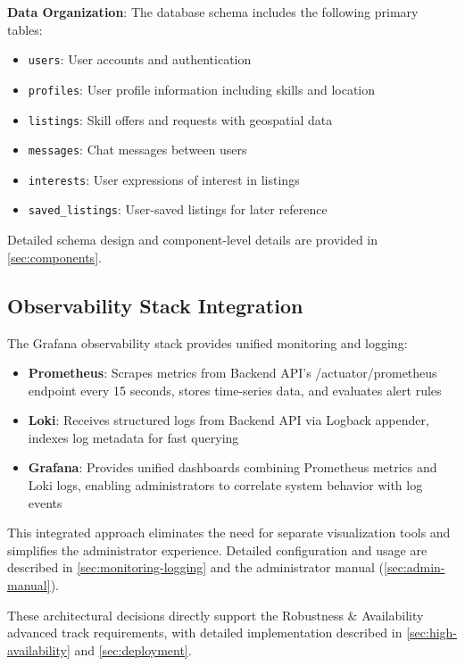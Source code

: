 \textbf{Data Organization}:
The database schema includes the following primary tables:
\begin{itemize}
    \item \texttt{users}: User accounts and authentication
    \item \texttt{profiles}: User profile information including skills and location
    \item \texttt{listings}: Skill offers and requests with geospatial data
    \item \texttt{messages}: Chat messages between users
    \item \texttt{interests}: User expressions of interest in listings
    \item \texttt{saved\_listings}: User-saved listings for later reference
\end{itemize}

Detailed schema design and component-level details are provided in \cref{sec:components}.

\subsection{Observability Stack Integration}

The Grafana observability stack provides unified monitoring and logging:

\begin{itemize}
    \item \textbf{Prometheus}: Scrapes metrics from Backend API's /actuator/prometheus endpoint every 15 seconds, stores time-series data, and evaluates alert rules
    \item \textbf{Loki}: Receives structured logs from Backend API via Logback appender, indexes log metadata for fast querying
    \item \textbf{Grafana}: Provides unified dashboards combining Prometheus metrics and Loki logs, enabling administrators to correlate system behavior with log events
\end{itemize}

This integrated approach eliminates the need for separate visualization tools and simplifies the administrator experience. Detailed configuration and usage are described in \cref{sec:monitoring-logging} and the administrator manual (\cref{sec:admin-manual}).

These architectural decisions directly support the Robustness \& Availability advanced track requirements, with detailed implementation described in \cref{sec:high-availability} and \cref{sec:deployment}.
